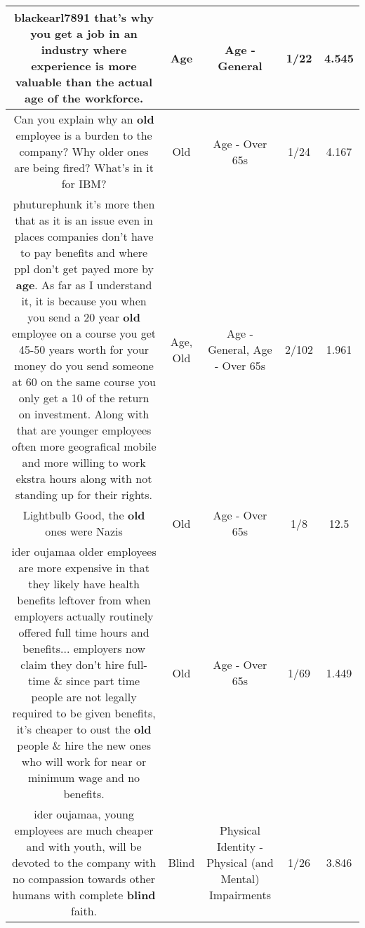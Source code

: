 \documentclass[11pt]{article}
\newlength\mylength
\begin{document}
\begin{center}
\begin{longtable}{|C{.65\mylength}|C{.30\mylength}|C{.12\mylength}|C{.12\mylength}|C{.12\mylength}|}
  \small blackearl7891 that's why you get a job in an industry where experience is more valuable than the actual \textbf{age} of the workforce.\normalsize   & Age & Age - General & 1/22 & 4.545 \\  \hline
  \small Can you explain why an \textbf{old} employee is a burden to the company?  Why older ones are being fired?  What's in it for IBM?\normalsize   & Old & Age - Over 65s & 1/24 & 4.167 \\  \hline
  \small phuturephunk it's more then that as it is an issue even in places companies don't have to pay benefits and where ppl don't get payed more by \textbf{age}. As far as I understand it, it is because you when you send a 20 year \textbf{old} employee on a course you get 45-50 years worth for your money do you send someone at 60 on the same course you only get a 10 of the return on investment. Along with that are younger employees often more geografical mobile and more willing to work ekstra hours along with not standing up for their rights.\normalsize   & Age, Old & Age - General, Age - Over 65s & 2/102 & 1.961 \\  \hline
  \small Lightbulb    Good, the \textbf{old} ones were Nazis\normalsize   & Old & Age - Over 65s & 1/8 & 12.5 \\  \hline
  \small ider oujamaa older employees are more expensive in that they likely have health benefits leftover from when employers actually routinely offered full time hours and benefits... employers now claim they don't hire full-time \& since part time people are not legally required to be given benefits, it's cheaper to oust the \textbf{old} people \& hire the new ones who will work for near or minimum wage and no benefits.\normalsize   & Old & Age - Over 65s & 1/69 & 1.449 \\  \hline
  \small ider oujamaa, young employees are much cheaper and with youth, will be devoted to the company with no compassion towards other humans with complete \textbf{blind} faith.\normalsize   & Blind & Physical Identity - Physical (and Mental) Impairments & 1/26 & 3.846 \\  \hline

\end{longtable}
\end{center}
\end{document}
